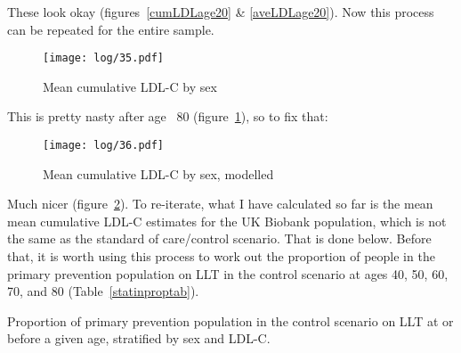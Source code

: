 \documentclass[11pt]{article}
\begin{document}
These look okay (figures~\ref{cumLDLage20} \& \ref{aveLDLage20}).
Now this process can be repeated for the entire sample. 

\color{Blue4}
\begin{stlog}\end{stlog}
\begin{figure}
    \centering
    \texttt{[image: log/35.pdf]}
    \caption{Mean cumulative LDL-C by sex}
    \label{cummeanLDL}
\end{figure}
\begin{stlog}\end{stlog}
\color{black}

This is pretty nasty after age ~80 (figure~\ref{cummeanLDL}), so to fix that:

\color{Blue4}
\begin{figure}
    \centering
    \texttt{[image: log/36.pdf]}
    \caption{Mean cumulative LDL-C by sex, modelled}
    \label{cummeanLDLmod}
\end{figure}
\begin{stlog}\end{stlog}
\color{black}

Much nicer (figure~\ref{cummeanLDLmod}). To re-iterate, what I have calculated so far is the mean mean cumulative LDL-C estimates for the
UK Biobank population, which is not the same as the standard of care/control scenario. That is done below. 
Before that, it is worth using this process to work out the proportion of people in the 
primary prevention population on LLT in the control scenario 
at ages 40, 50, 60, 70, and 80 (Table~\ref{statinproptab}).

\begin{table}[h!]
  \begin{center}
    \caption{Proportion of primary prevention population in the control scenario on LLT 
at or before a given age, stratified by sex and LDL-C.}
    \label{statinproptab}
     \selectfont{}
  \end{center}
\end{table}
\end{document}
